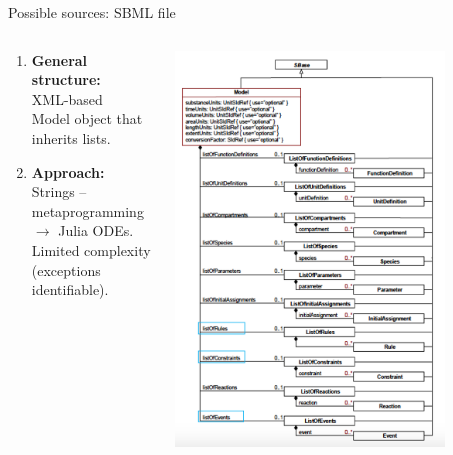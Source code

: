 \documentclass{beamer}
\begin{document}
\begin{frame}{Possible sources: SBML file}
\begin{columns}
\begin{column}{0.5\textwidth}
   \begin{enumerate}
\item \textbf{General structure:} \\
\medskip
XML-based \\
Model object that inherits lists. \\
\bigskip
\item \textbf{Approach:} \\

\medskip
Strings --  metaprogramming $\rightarrow$ Julia ODEs. \\
Limited complexity (exceptions identifiable). \\
\end{enumerate}
\end{column}
\begin{column}{0.5\textwidth}  %
    \begin{center}
     \includegraphics[width=0.8\textwidth]{Picture3.png}
     \end{center}
\end{column}
\end{columns}
\end{frame}
\end{document}
